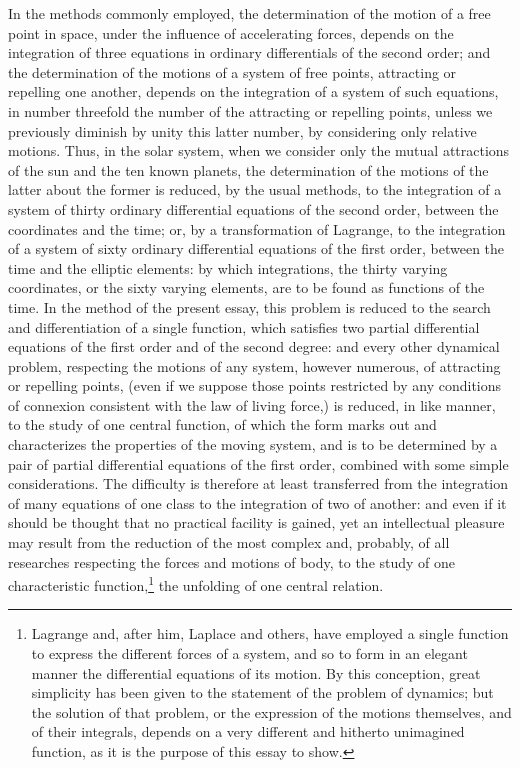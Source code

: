 In the methods commonly employed, the determination of the motion
of a free point in space, under the influence of accelerating
forces, depends on the integration of three equations in ordinary
differentials of the second order; and the determination of the
motions of a system of free points, attracting or repelling one
another, depends on the integration of a system of such
equations, in number threefold the number of the attracting or
repelling points, unless we previously diminish by unity this
latter number, by considering only relative motions.  Thus, in
the solar system, when we consider only the mutual attractions of
the sun and the ten known planets, the determination of the
motions of the latter about the former is reduced, by the usual
methods, to the integration of a system of thirty ordinary
differential equations of the second order, between the
coordinates and the time; or, by a transformation of {\sc Lagrange},
to the integration of a system of sixty ordinary differential
equations of the first order, between the time and the elliptic
elements: by which integrations, the thirty varying coordinates,
or the sixty varying elements, are to be found as functions of
the time.  In the method of the present essay, this problem is
reduced to the search and differentiation of a single function,
which satisfies two partial differential equations of the first
order and of the second degree: and every other dynamical
problem, respecting the motions of any system, however numerous,
of attracting or repelling points, (even if we suppose those
points restricted by any conditions of connexion consistent with
the law of living force,) is reduced, in like manner, to the
study of one central function, of which the form marks out and
characterizes the properties of the moving system, and is to be
determined by a pair of partial differential equations of the
first order, combined with some simple considerations.  The
difficulty is therefore at least transferred from the integration
of many equations of one class to the integration of two of
another: and even if it should be thought that no practical
facility is gained, yet an intellectual pleasure may result from
the reduction of the most complex and, probably, of all
researches respecting the forces and motions of body, to the
study of one characteristic function,\footnote*{{\sc Lagrange}
and, after him, {\sc Laplace} and others, have employed a single
function to express the different forces of a system, and so to
form in an elegant manner the differential equations of its
motion.  By this conception, great simplicity has been given
to the statement of the problem of dynamics; but the solution
of that problem, or the expression of the motions themselves,
and of their integrals, depends on a very different and hitherto
unimagined function, as it is the purpose of this essay to show.}
the unfolding of one central relation.

